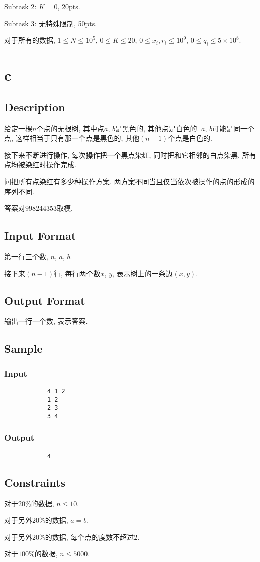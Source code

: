 \documentclass[UTF8, 11pt]{ctexart}
\begin{document}
\begin{CJK}{UTF8}{gkai}
\begin{spacing}{1.2}
			Subtask 2: $K=0$, 20pts.

			Subtask 3: 无特殊限制, 50pts.

			对于所有的数据, $1\le N\le10^5$, $0\le K \le 20$, $0\le x_i,r_i\le10^9$, $0\le q_i\le 5\times 10^8$.
	\newpage
	\section{c}
		\subsection{Description}
			给定一棵$n$个点的无根树, 其中点$a$, $b$是黑色的, 其他点是白色的. $a$, $b$可能是同一个点, 这样相当于只有那一个点是黑色的, 其他$(n-1)$个点是白色的.

			接下来不断进行操作, 每次操作把一个黑点染红, 同时把和它相邻的白点染黑. 所有点均被染红时操作完成.

			问把所有点染红有多少种操作方案. 两方案不同当且仅当依次被操作的点的形成的序列不同.

			答案对$998244353$取模.
		\subsection{Input Format}
			第一行三个数, $n$, $a$, $b$.

			接下来$(n-1)$行, 每行两个数$x$, $y$, 表示树上的一条边$(x,y)$.
		\subsection{Output Format}
			输出一行一个数, 表示答案.
		\subsection{Sample}
		\subsubsection{Input}
		\begin{verbatim}
		    4 1 2
		    1 2
		    2 3
		    3 4
		\end{verbatim}
		\subsubsection{Output}
		\begin{verbatim}
		    4
		\end{verbatim}

		\subsection{Constraints}
			对于$20\%$的数据, $n\le 10$.

			对于另外$20\%$的数据, $a=b$.

			对于另外$20\%$的数据, 每个点的度数不超过$2$.

			对于$100\%$的数据, $n\le5000$.
		\newpage

\end{spacing}
\end{CJK}
\end{document}
